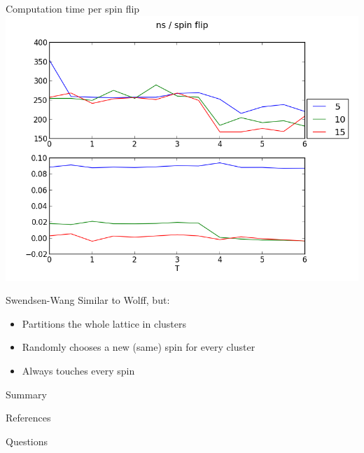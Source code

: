 \documentclass[]{beamer}
\begin{document}
\begin{frame}{Computation time per spin flip}
\includegraphics[width=\textwidth]{../results/measurements/nsPerSpinFlip.png}
\note{ }
\end{frame}

\begin{frame}{Swendsen-Wang}
Similar to Wolff, but:
\begin{itemize}
\item<2-> Partitions the whole lattice in clusters
\item<3-> Randomly chooses a new (same) spin for every cluster
\item<4-> Always touches every spin
\end{itemize}
\note{ }
\end{frame}

\begin{frame}{Summary}
\note{ }
\end{frame}

\begin{frame}{References}
\note{ }
\end{frame}

\begin{frame}
\centerline{\huge{Questions}}
\note{ }
\end{frame}
\end{document}
